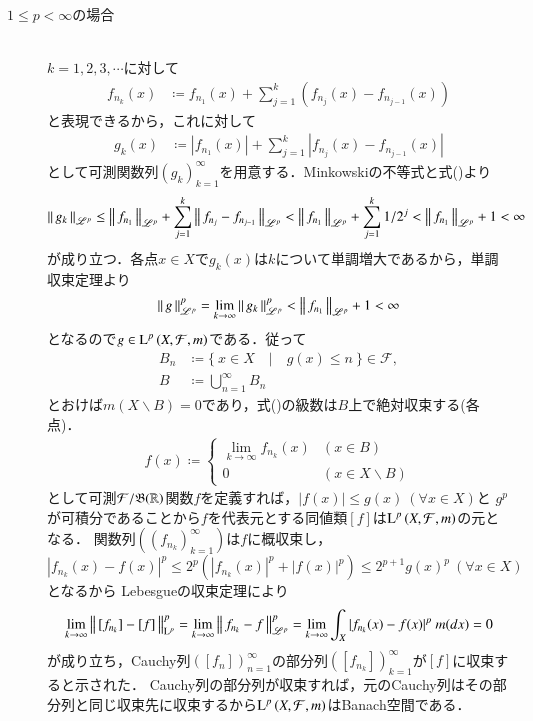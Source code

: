 \begin{qst}
\begin{prf}
\begin{description}
		\item[$1 \leq p < \infty$の場合]\mbox{}\\
			$k=1,2,3,\cdots$に対して
			\begin{align}	
				f_{n_k}(x) &\coloneqq f_{n_1}(x) + \sum_{j=1}^{k}(f_{n_j}(x) - f_{n_{j-1}}(x)) \label{eq:Lp_banach_3}
			\end{align}
			と表現できるから，これに対して
			\begin{align}
				g_k(x) &\coloneqq |f_{n_1}(x)| + \sum_{j=1}^{k}|f_{n_j}(x) - f_{n_{j-1}}(x)|
			\end{align}
			として可測関数列$(g_k)_{k=1}^{\infty}$を用意する．Minkowskiの不等式と式()より
			\begin{align}
				\left\|\, g_k\, \right\|_{\mathscr{L}^p} \leq \left\|\, f_{n_1}\, \right\|_{\mathscr{L}^p} + \sum_{j=1}^{k}\left\|\, f_{n_j} - f_{n_{j-1}}\, \right\|_{\mathscr{L}^p}
				< \left\|\, f_{n_1}\, \right\|_{\mathscr{L}^p} + \sum_{j=1}^{k} 1/2^j < \left\|\, f_{n_1}\, \right\|_{\mathscr{L}^p} + 1 < \infty
			\end{align}
			が成り立つ．各点$x \in X$で$g_k(x)$は$k$について単調増大であるから，単調収束定理より
			\begin{align}
				\left\|\, g\, \right\|_{\mathscr{L}^p}^p = \lim_{k \to \infty} \left\|\, g_k\, \right\|_{\mathscr{L}^p}^p < \left\|\, f_{n_1}\, \right\|_{\mathscr{L}^p} + 1 < \infty
			\end{align}
			となるので$g \in \operatorname{L}^{p} \left(X,\mathcal{F},m\right)$である．従って
			\begin{align}
				B_n &\coloneqq \{\ x \in X\quad |\quad g(x) \leq n\ \} \in \mathcal{F}, \\
				B &\coloneqq \bigcup_{n=1}^{\infty} B_n
			\end{align}
			とおけば$m(X \backslash B) = 0$であり，式()の級数は$B$上で絶対収束する(各点)．
			\begin{align}
				f(x) \coloneqq
				\begin{cases}
					\lim\limits_{k \to \infty} f_{n_k}(x) & (x \in B) \\
					0 & (x \in X \backslash B)
				\end{cases}
			\end{align}
			として可測$\mathcal{F}/\mathfrak{B}(\mathbb{R})$関数$f$を定義すれば，$|f(x)| \leq g(x)\ (\forall x \in X)$と
			$g^p$が可積分であることから$f$を代表元とする同値類$[f]$は$\operatorname{L}^{p} \left(X,\mathcal{F},m\right)$の元となる．
			関数列$(\left( f_{n_k} \right)_{k=1}^{\infty})$は$f$に概収束し，
			$|f_{n_k}(x) - f(x)|^p \leq 2^p(|f_{n_k}(x)|^p + |f(x)|^p) \leq 2^{p+1} g(x)^p\ (\forall x \in X)$となるから
			Lebesgueの収束定理により
			\begin{align}
				\lim_{k \to \infty}\Norm{[f_{n_k}] - [f]}{\mathrm{L}^p}^p
				= \lim_{k \to \infty}\Norm{f_{n_k} - f}{\mathscr{L}^p}^p
				= \lim_{k \to \infty} \int_X |f_{n_k}(x) - f(x)|^p\ m(dx) = 0
			\end{align}
			が成り立ち，Cauchy列$\left( [f_{n}] \right)_{n=1}^{\infty}$の部分列$\left( [f_{n_k}] \right)_{k=1}^{\infty}$が$[f]$に収束すると示された．
			Cauchy列の部分列が収束すれば，元のCauchy列はその部分列と同じ収束先に収束するから$\operatorname{L}^{p} \left(X,\mathcal{F},m\right)$はBanach空間である．
	\end{description}
	\QED
\end{prf}

\end{qst}